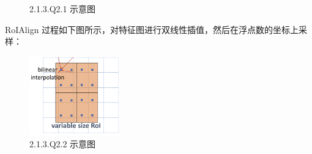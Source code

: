 \documentclass[cn,10pt,math=newtx,citestyle=gb7714-2015,bibstyle=gb7714-2015]{elegantbook}
\begin{document}
\begin{figure}[ht]
\centering
\centering
\caption{2.1.3.Q2.1 示意图}
\end{figure}

RoIAlign 过程如下图所示，对特征图进行双线性插值，然后在浮点数的坐标上采样：
\begin{figure}[ht]
  \centering
  \includegraphics[width=0.35\textwidth]{image/2.1.3.q2.3.png}
  \caption{2.1.3.Q2.2 示意图}
\end{figure}
\end{document}

